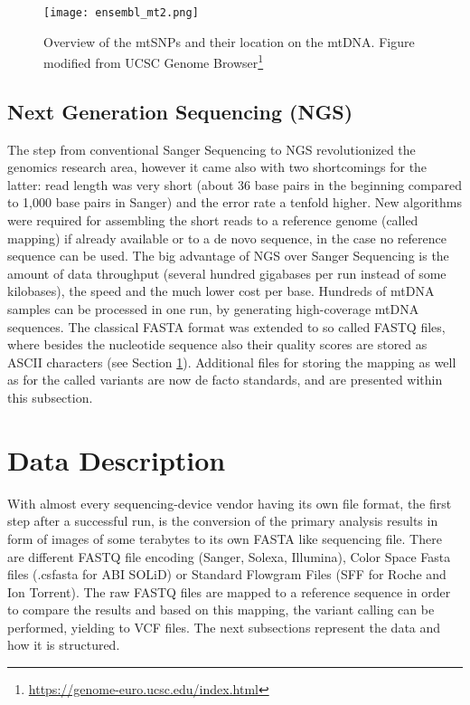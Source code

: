 \begin{figure}[ht]
\begin{center}
\texttt{[image: ensembl\_mt2.png]}
\caption[mtSNPs location on mtDNA]{Overview of the mtSNPs and their location on the mtDNA. Figure modified from UCSC Genome Browser\footnote{\url{https://genome-euro.ucsc.edu/index.html}}}
\label{fig:figureSNPlocation}
\end{center}
\end{figure}

\subsection{Next Generation Sequencing (NGS)}
The step from conventional Sanger Sequencing to NGS revolutionized the genomics research area, however it came also with two shortcomings for the latter: read length was very short (about 36 base pairs \cite{Li2013a} in the beginning compared to 1,000 base pairs in Sanger) and the error rate a tenfold higher. New algorithms were required for assembling the short reads to a reference genome (called mapping) if already available or to a de novo sequence, in the case no reference sequence can be used. The big advantage of NGS over Sanger Sequencing is the amount of data throughput (several hundred gigabases per run instead of some kilobases), the speed and the much lower cost per base. Hundreds of mtDNA samples can be processed in one run, by generating high-coverage mtDNA sequences. 
The classical FASTA format was extended to so called FASTQ files, where besides the nucleotide sequence also their quality scores are stored as ASCII characters (see Section \ref{datadescription}). Additional files for storing the mapping as well as for the called variants are now de facto standards, and are presented within this subsection. 
\section{Data Description}\label{datadescription}
With almost every sequencing-device vendor having its own file format, the first step after a successful run, is the conversion of the primary analysis results in form of images of some terabytes to its own FASTA like sequencing file. There are different FASTQ file encoding (Sanger, Solexa, Illumina), Color Space Fasta files (.csfasta for ABI SOLiD) or Standard Flowgram Files (SFF for Roche and Ion Torrent). The raw FASTQ files are mapped to a reference sequence in order to compare the results and based on this mapping, the variant calling can be performed, yielding to VCF files. The next subsections represent the data and how it is structured. 
